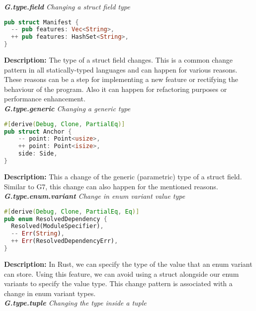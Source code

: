\noindent \textit{ \textbf{G.type.field} Changing a struct field type}

\begin{lstlisting}[language=Rust, style=colouredRust, label={l3}]
pub struct Manifest {
  -- pub features: Vec<String>,
  ++ pub features: HashSet<String>,
}

\end{lstlisting}

\noindent \textbf{Description:} The type of a struct field changes. This is a common change pattern in all statically-typed languages and can happen for various reasons. These reasons can be a step for implementing a new feature or rectifying the behaviour of the program. Also it can happen for refactoring purposes or performance enhancement. \\


\noindent \textit{ \textbf{G.type.generic} Changing a generic type}

\begin{lstlisting}[language=Rust, style=colouredRust, label={l3}]
#[derive(Debug, Clone, PartialEq)]
pub struct Anchor {
    -- point: Point<usize>,
    ++ point: Point<isize>,
    side: Side,
}

\end{lstlisting}

\noindent \textbf{Description:} This a change of the generic (parametric) type of a struct field. Similar to G7, this change can also happen for the mentioned reasons. \\

\noindent \textit{ \textbf{G.type.enum.variant} Change in enum variant value type}

\begin{lstlisting}[language=Rust, style=colouredRust, label={l3}]
#[derive(Debug, Clone, PartialEq, Eq)]
pub enum ResolvedDependency {
  Resolved(ModuleSpecifier),
  -- Err(String),
  ++ Err(ResolvedDependencyErr),
}

\end{lstlisting}

\noindent \textbf{Description:} In Rust, we can specify the type of the value that an enum variant can store. Using this feature, we can avoid using a struct alongside our enum variants to specify the value type. This change pattern is associated with a change in enum variant types. \\


\noindent \textit{ \textbf{G.type.tuple} Changing the type inside a tuple}

